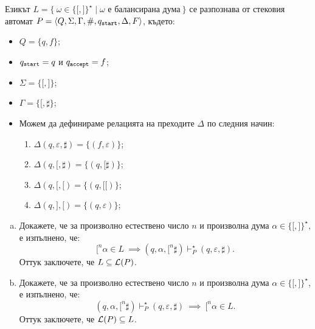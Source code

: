 \begin{extra}
\begin{example}
  Езикът $L = \{\ \omega \in \{\texttt{[},\texttt{]}\}^\star \mid \omega\text{ е балансирана дума}\ \}$ се разпознава от стековия автомат $P = \langle{Q,\Sigma,\Gamma,\#,q_{\texttt{start}},\Delta,F}\rangle$, където:
  \begin{itemize}
  \item 
    $Q = \{q,f\}$;
  \item
    $q_{\texttt{start}} = q$ и $q_{\texttt{accept}} = f$;
  \item
    $\Sigma = \{\texttt{[},\texttt{]}\}$;
  \item
    $\Gamma = \{\texttt{[}, \sharp\}$;
  \item
    Можем да дефинираме релацията на преходите $\Delta$ по следния начин:
    \begin{enumerate}[(1)]
    \item 
      $\Delta(q, \varepsilon, \sharp) = \{(f, \varepsilon)\}$;
    \item
      $\Delta(q, \texttt{[}, \sharp) = \{(q, \texttt{[}\sharp)\}$;
    \item
      $\Delta(q, \texttt{[}, \texttt{[}) = \{(q, \texttt{[[})\}$;
    \item
      $\Delta(q, \texttt{]}, \texttt{[}) = \{(q, \varepsilon)\}$;
    \end{enumerate}
  \end{itemize}  
  \begin{enumerate}[(a)]
  \item
    Докажете, че за произволно естествено число $n$ и произволна дума $\alpha \in \{\texttt{[}, \texttt{]}\}^\star$, 
    е изпълнено, че:
    \[\texttt{[}^n\alpha \in L\ \implies (q, \alpha, \texttt{[}^n\sharp) \vdash^\star_P (q, \varepsilon, \sharp).\]
    Оттук заключете, че $L \subseteq \mathcal{L}(P)$.
  \item
    Докажете, че за произволно естествено число $n$ и произволна дума $\alpha \in \{\texttt{[}, \texttt{]}\}^\star$, е изпълнено, че:
    \[(q,\alpha,\texttt{[}^n\sharp) \vdash^\star_P (q, \varepsilon, \sharp)\ \implies\ \texttt{[}^n\alpha \in L.\]
    Оттук заключете, че $\mathcal{L}(P) \subseteq L$.
  \end{enumerate}
\end{example}
\end{extra}


